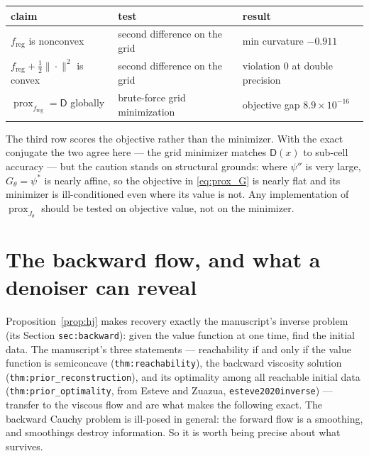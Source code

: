 \documentclass[11pt]{article}
\theoremstyle{definition}
\newcommand{\D}{\mathsf{D}}
\newcommand{\freg}{f_{\mathrm{reg}}}
\newcommand{\prox}{\operatorname{prox}}
\newcommand{\code}[1]{\texttt{#1}}
\begin{document}
\begin{center}
\begin{tabular}{lll}
\toprule
claim & test & result \\
\midrule
$\freg$ is nonconvex & second difference on the grid & min curvature $-0.911$ \\
$\freg + \tfrac12\|\cdot\|^2$ is convex & second difference on the grid & violation $0$ at double precision \\
$\prox_{\freg} = \D$ globally & brute-force grid minimization & objective gap $8.9\times10^{-16}$ \\
\bottomrule
\end{tabular}
\end{center}

The third row scores the objective rather than the minimizer. With the exact conjugate the two agree here — the grid minimizer matches $\D(x)$ to sub-cell accuracy — but the caution stands on structural grounds: where $\psi''$ is very large, $G_\theta = \psi^*$ is nearly affine, so the objective in \eqref{eq:prox_G} is nearly flat and its minimizer is ill-conditioned even where its value is not. Any implementation of $\prox_{J_\theta}$ should be tested on objective value, not on the minimizer.

\section{The backward flow, and what a denoiser can reveal}
\label{sec:backward}

Proposition~\ref{prop:hj} makes recovery exactly the manuscript's inverse problem (its Section \code{sec:backward}): given the value function at one time, find the initial data. The manuscript's three statements — reachability if and only if the value function is semiconcave (\code{thm:reachability}), the backward viscosity solution (\code{thm:prior\_reconstruction}), and its optimality among all reachable initial data (\code{thm:prior\_optimality}, from Esteve and Zuazua, \code{esteve2020inverse}) — transfer to the viscous flow and are what makes the following exact. The backward Cauchy problem is ill-posed in general: the forward flow is a smoothing, and smoothings destroy information. So it is worth being precise about what survives.
\end{document}
